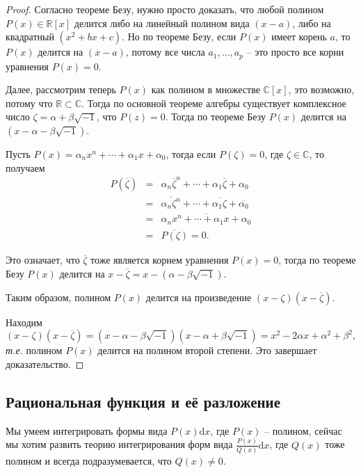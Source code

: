 \begin{proof}
Согласно теореме Безу, нужно просто доказать, что любой полином $P(x) \in \mathbb{R}[x]$ делится либо на линейный полином вида $(x-a)$, либо на квадратный $(x^2 + bx + c)$. Но по теореме Безу, если $P(x)$ имеет корень $a$, то $P(x)$ делится на $(x-a)$, потому все числа $a_1,\ldots, a_p$ -- это просто все корни уравнения $P(x) = 0$.
    
Далее, рассмотрим теперь $P(x)$ как полином в множестве $\mathbb{C}[x]$, это возможно, потому что $\mathbb{R} \subset \mathbb{C}$. Тогда по основной теореме алгебры существует комплексное число $\zeta = \alpha + \beta \sqrt{-1}$, что $P(z) =0$. Тогда по теореме Безу $P(x)$ делится на $(x- \alpha - \beta \sqrt{-1})$.
    
Пусть $P(x) = \alpha_nx^n + \cdots + \alpha_1 x + \alpha_0$, тогда если $P(\zeta) =0$, где $\zeta \in \mathbb{C}$, то получаем
\begin{eqnarray*}
    P(\overline{\zeta}) &=&  \alpha_n {\overline{\zeta}}^n + \cdots + \alpha_1 \overline{\zeta} + \alpha_0 \\
    &=& \overline{\alpha_n \zeta^n} + \cdots + \overline{\alpha_1 \zeta} + \overline{\alpha_0} \\
    &=& \overline{\alpha_nx^n + \cdots + \alpha_1 x + \alpha_0} \\
    &=& \overline{P(\zeta)} = 0.
\end{eqnarray*}

Это означает, что $\overline{\zeta}$ тоже является корнем уравнения $P(x) = 0$, тогда по теореме Безу $P(x)$ делится на $x - \overline{\zeta} = x - (\alpha -\beta \sqrt{-1})$.

Таким образом, полином $P(x)$ делится на произведение $(x - \zeta)(x - \overline{\zeta})$.

Находим
\[
 (x - \zeta)(x - \overline{\zeta}) = (x - \alpha - \beta \sqrt{-1})(x - \alpha + \beta \sqrt{-1}) = x^2 - 2 \alpha x + \alpha^2 + \beta^2,
\]
\textit{т.е.} полином $P(x)$ делится на полином второй степени. Это завершает доказательство. 
\end{proof}


\subsection{Рациональная функция и её разложение}

Мы умеем интегрировать формы вида $P(x) \mathrm{d}x$, где $P(x)$ -- полином, сейчас мы хотим развить теорию интегрирования форм вида $\frac{P(x)}{Q(x)}\mathrm{d}x$, где $Q(x)$ тоже полином и всегда подразумевается, что $Q(x) \ne 0$. 

